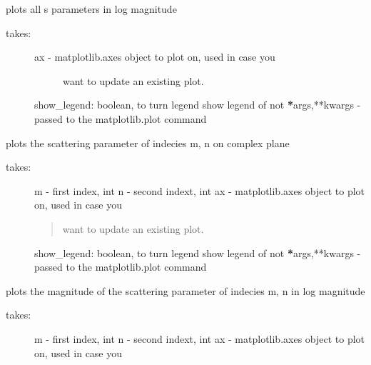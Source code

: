 \documentclass[letterpaper,10pt,english]{sphinxmanual}
\begin{document}
\begin{fulllineitems}
\begin{fulllineitems}
\label{api/mwavepy:mwavepy.network.Network.plot_s_all_db}
plots all s parameters in log magnitude
\begin{description}
\item[{takes:}] \leavevmode\begin{description}
\item[{ax - matplotlib.axes object to plot on, used in case you}] \leavevmode
want to update an existing plot.

\end{description}

show\_legend: boolean, to turn legend show legend of not
{\color{red}\bfseries{}*}args,**kwargs - passed to the matplotlib.plot command

\end{description}

\end{fulllineitems}


\begin{fulllineitems}
\label{api/mwavepy:mwavepy.network.Network.plot_s_complex}
plots the scattering parameter of indecies m, n on complex plane
\begin{description}
\item[{takes:}] \leavevmode
m - first index, int
n - second indext, int
ax - matplotlib.axes object to plot on, used in case you
\begin{quote}

want to update an existing plot.
\end{quote}

show\_legend: boolean, to turn legend show legend of not
{\color{red}\bfseries{}*}args,**kwargs - passed to the matplotlib.plot command

\end{description}

\end{fulllineitems}


\begin{fulllineitems}
\label{api/mwavepy:mwavepy.network.Network.plot_s_db}
plots the magnitude of the scattering parameter of indecies m, n
in log magnitude
\begin{description}
\item[{takes:}] \leavevmode
m - first index, int
n - second indext, int
ax - matplotlib.axes object to plot on, used in case you
\begin{quote}


\end{quote}
\end{description}
\end{fulllineitems}
\end{fulllineitems}
\end{document}
